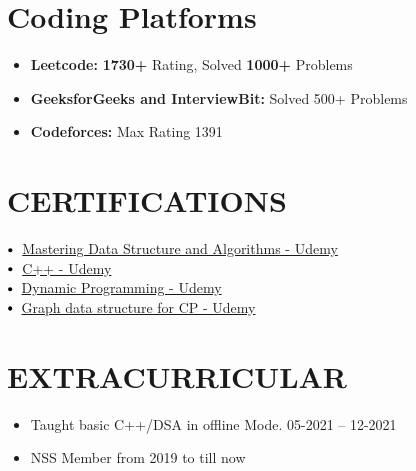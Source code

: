 \documentclass[letterpaper,11pt]{article}
\makeatletter
\newcommand{\resumeItem}[1]{
  \item\small{
    {#1 \vspace{-2pt}}
  }
}
\newcommand{\resumeSubheading}[4]{
  \vspace{-2pt}\item
    \begin{tabular*}{1.0\textwidth}[t]{l@{\extracolsep{\fill}}r}
      \textbf{\large#1} & \textbf{\small #2} \\
      \textit{\large#3} & \textit{\small #4} \\
      
    \end{tabular*}\vspace{-7pt}
}
\newcommand{\resumeSubHeadingListStart}{\begin{itemize}[leftmargin=0.0in, label={}]}
\newcommand{\resumeSubHeadingListEnd}{\end{itemize}}
\newcommand{\resumeItemListStart}{\begin{itemize}}
\newcommand{\resumeItemListEnd}{\end{itemize}\vspace{-5pt}}
\newcommand\sbullet[1][.5]{\mathbin{\vcenter{\hbox{\scalebox{#1}{$\bullet$}}}}}
\makeatother
\begin{document}
\section{Coding Platforms}
\resumeSubHeadingListStart
    \resumeItemListStart
        \resumeItem{\textbf{Leetcode:} \textbf{1730+} Rating, Solved \textbf{1000+} Problems
        \href{https://leetcode.com/aman_2_0_2_3/}{\raisebox{-0.1\height}{\faExternalLink}}}
        \resumeItem{\textbf{GeeksforGeeks and InterviewBit:} Solved 500+ Problems
        \href{https://auth.geeksforgeeks.org/user/aman_2_0_2_3/practice}{\raisebox{-0.1\height}{\faExternalLink}}}
        \resumeItem{\textbf{Codeforces:} Max Rating 1391
        \href{https://codeforces.com/profile/abthecoder23}{\raisebox{-0.1\height}{\faExternalLink}}}
    \resumeItemListEnd
\resumeSubHeadingListEnd
\vspace{-11pt}


 
\section{CERTIFICATIONS}

$\sbullet[.75] \hspace{0.1cm}$ {\href{https://www.udemy.com/certificate/UC-c0e8dc21-8e8b-4f6e-9d05-5d109a9523cd/}{Mastering Data Structure and Algorithms - Udemy}} \hspace{2.59cm}\\
$\sbullet[.75] \hspace{0.1cm}$ {\href{https://www.udemy.com/certificate/UC-b732c216-80d9-448c-b5fd-42b4aa7ca0ee/}{C++ - Udemy}} \hspace{1.6cm}\\
$\sbullet[.75] \hspace{0.2cm}${\href{certificateLink.com} {Dynamic Programming - Udemy}}\hspace{1.6cm}\\
$\sbullet[.75] \hspace{0.2cm}${\href{certificateLink.com}{Graph data structure for CP - Udemy}} \hspace{1cm}\\




 \section{EXTRACURRICULAR}
    \resumeSubHeadingListStart
        
            \resumeItemListStart
                \resumeItem{\normalsize{Taught basic C++/DSA in offline Mode.          05-2021 -- 12-2021}}
                \resumeItem{\normalsize{NSS Member from 2019 to till now }}
            \resumeItemListEnd
    \resumeSubHeadingListEnd
 \vspace{-11pt}
 
 
\end{document}
